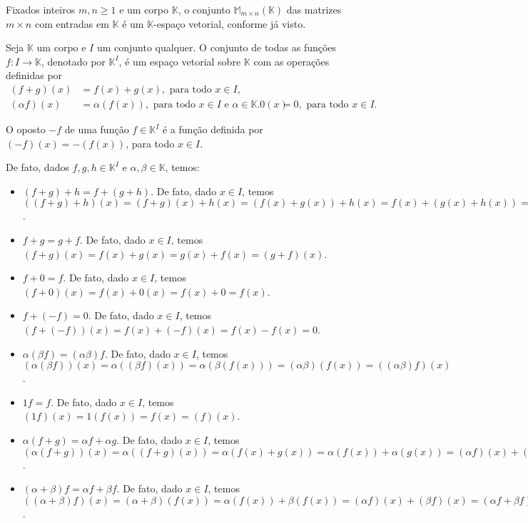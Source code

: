 \begin{example}[Matrizes]
    Fixados inteiros $m, n \geq 1$ e um corpo $\mathbb K$, o conjunto $\mathbb M_{m \times n}(\mathbb K)$ das matrizes $m \times n$ com entradas em $\mathbb K$ é um $\mathbb K$-espaço vetorial, conforme já visto.
\end{example}

\begin{example}
    Seja $\mathbb K$ um corpo e $I$ um conjunto qualquer.
    O conjunto de todas as funções $f: I \to \mathbb K$, denotado por $\mathbb K^I$, é um espaço vetorial sobre $\mathbb K$ com as operações definidas por
    \begin{align*}
        (f + g)(x) &= f(x) + g(x), \text{ para todo } x \in I,\\
        (\alpha f)(x) &= \alpha (f(x)), \text{ para todo } x \in I \text{ e } \alpha \in \mathbb K.
        0(x) &= 0, \text{ para todo } x \in I.
    \end{align*}

    O oposto $-f$ de uma função $f \in \mathbb K^I$ é a função definida por $(-f)(x) = - (f(x))$, para todo $x \in I$.

    De fato, dados $f, g, h \in \mathbb K^I$ e $\alpha, \beta \in \mathbb K$, temos:
    \begin{itemize}
        \item[A1.] $(f+g)+h=f+(g+h)$.
        De fato, dado $x \in I$, temos $((f + g) + h)(x) = (f + g)(x) + h(x) = (f(x) + g(x)) + h(x) = f(x) + (g(x) + h(x)) = f(x) + (g + h)(x) = (f + (g + h))(x)$.
        \item[A2.] $f + g = g + f$.
        De fato, dado $x \in I$, temos $(f + g)(x) = f(x) + g(x) = g(x) + f(x) = (g + f)(x)$.
        \item[A3.] $f + 0 = f$.
        De fato, dado $x \in I$, temos $(f + 0)(x) = f(x) + 0(x) = f(x) + 0 = f(x)$.
        \item[A4.] $f + (-f) = 0$.
        De fato, dado $x \in I$, temos $(f + (-f))(x) = f(x) + (-f)(x) = f(x) - f(x) = 0$.
        \item[M1.] $\alpha(\beta f) = (\alpha \beta)f$.
        De fato, dado $x \in I$, temos $(\alpha(\beta f))(x) = \alpha((\beta f)(x)) = \alpha(\beta (f(x))) = (\alpha \beta)(f(x)) = ((\alpha \beta)f)(x)$.
        \item[M2.] $1 f = f$.
        De fato, dado $x \in I$, temos $(1 f)(x) = 1 (f(x)) = f(x) = (f)(x)$.
        \item[D1.] $\alpha(f + g) = \alpha f + \alpha g$.
        De fato, dado $x \in I$, temos $(\alpha(f + g))(x) = \alpha((f + g)(x)) = \alpha(f(x) + g(x)) = \alpha(f(x)) + \alpha(g(x)) = (\alpha f)(x) + (\alpha g)(x) = (\alpha f + \alpha g)(x)$.
        \item[D2.] $(\alpha + \beta)f = \alpha f + \beta f$.
        De fato, dado $x \in I$, temos $((\alpha + \beta)f)(x) = (\alpha + \beta)(f(x)) = \alpha(f(x)) + \beta(f(x)) = (\alpha f)(x) + (\beta f)(x) = (\alpha f + \beta f)(x)$.
    \end{itemize}
\end{example}

